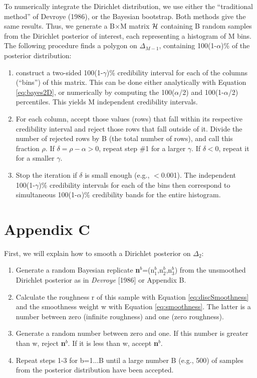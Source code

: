 \documentclass{article}
\begin{document}
To numerically integrate the Dirichlet distribution, we use either the
``traditional method''  of Devroye (1986), or  the Bayesian bootstrap.
Both methods  give the same  results.  Thus, we generate  a B$\times$M
matrix  ${\cal H}$  containing  B random  samples  from the  Dirichlet
posterior of interest,  each representing a histogram of  M bins.  The
following  procedure  finds a  polygon  on $\Delta_{M-1}$,  containing
100(1-$\alpha$)\% of the posterior distribution:
\begin{enumerate}
\item construct a two-sided 100(1-$\gamma$)\% credibility interval for
each  of the  columns (``bins'')  of this  matrix.  This  can  be done
either analytically with  Equation \ref{eq:bayes2D}, or numerically by
computing the 100($\alpha$/2) and 100(1-$\alpha$/2) percentiles.  This
yields M independent credibility intervals.
\item For each column, accept those values (rows) that fall within its
respective  credibility  interval  and  reject those  rows  that  fall
outside of  it.  Divide the  number of rejected  rows by B  (the total
number   of    rows),   and    call   this   fraction    $\rho$.    If
$\delta=\rho-\alpha>0$,  repeat step  \#1 for  a larger  $\gamma$.  If
$\delta<0$, repeat it for a smaller $\gamma$.
\item Stop the iteration if $\delta$ is small enough (e.g., $<$0.001).
The  independent 100(1-$\gamma$)\% credibility  intervals for  each of
the bins then correspond to simultaneous 100(1-$\alpha$)\% credibility
bands for the entire histogram.
\end{enumerate}

\section*{Appendix C} \label{app:C}

First,  we  will  explain  how  to smooth  a  Dirichlet  posterior  on
$\Delta_2$:
\begin{enumerate}
\item     Generate     a     random    Bayesian     replicate     {\bf
n}$^{b}$=(n$^{b}_{1}$,n$^{b}_{2}$,n$^{b}_{3}$)   from  the  unsmoothed
Dirichlet posterior as in {\it Devroye} [1986] or Appendix B.
\item  Calculate  the  roughness   r  of  this  sample  with  Equation
\ref{eq:discSmoothness}  and  the smoothness  weight  w with  Equation
\ref{eq:smoothness}.  The  latter is  a number between  zero (infinite
roughness) and one (zero roughness).
\item Generate a random number between zero and one. If this number is
greater than  w, reject {\bf n}$^{b}$.  If it is less  than w, accept
{\bf n}$^{b}$.
\item Repeat steps 1-3 for b=1...B  until a large number B (e.g., 500)
of samples from the posterior distribution have been accepted.\\
\end{enumerate}
\end{document}
